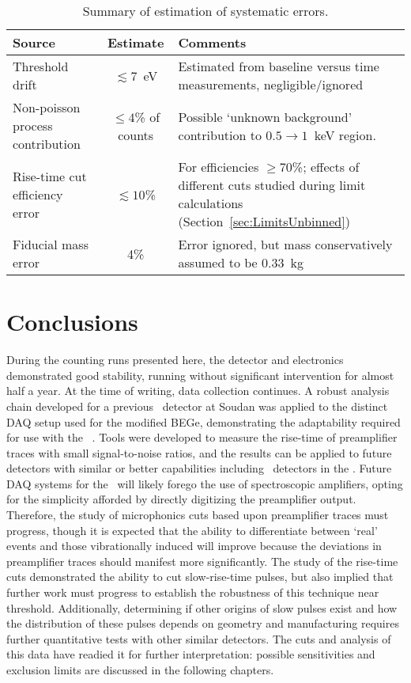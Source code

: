 			\begin{table} 
				\centering
				\begin{tabular}{p{}  c  p{}  } 
				\toprule
					Source & Estimate & Comments \\
				\midrule	
					Threshold drift & $\lesssim7$~eV & Estimated from baseline versus time measurements, negligible/ignored \\
					Non-poisson process contribution & $\leq4$\% of counts & Possible `unknown background' contribution to $0.5\to1$~keV region.  \\			
					Rise-time cut efficiency error & $\lesssim10$\% & For efficiencies $\geq$70\%; effects of different cuts studied during limit calculations (Section~\ref{sec:LimitsUnbinned}) \\
					Fiducial mass error & 4\% & Error ignored, but mass conservatively assumed to be 0.33~kg\\

				\bottomrule
				\end{tabular}	
				\caption{Summary of estimation of systematic errors.}
				\label{tab:BeGeSysErrors}
			\end{table}
	\section{Conclusions}
     	\label{sec:BeGeConclusions}		
	
	During the counting runs presented here, the detector and electronics demonstrated good stability, running without significant intervention for almost half a year.  At the time of writing, data collection continues.  A robust analysis chain developed for a previous \ppc~detector at Soudan was applied to the distinct DAQ setup used for the modified BEGe, demonstrating the adaptability required for use with the \MJ~\minmod.  Tools were developed to measure the rise-time of preamplifier traces with small signal-to-noise ratios, and the results can be applied to future detectors with similar or better capabilities including \ppc~detectors in the \minmod.  Future DAQ systems for the \minmod~will likely forego the use of spectroscopic amplifiers, opting for the simplicity afforded by directly digitizing the preamplifier output.  Therefore, the study of microphonics cuts based upon preamplifier traces must progress, though it is expected that the ability to differentiate between `real' events and those vibrationally induced will improve because the deviations in preamplifier traces should manifest more significantly.  The study of the rise-time cuts demonstrated the ability to cut slow-rise-time pulses, but also implied that further work must progress to establish the robustness of this technique near threshold.  Additionally, determining if other origins of slow pulses exist and how the distribution of these pulses depends on geometry and manufacturing requires further quantitative tests with other similar detectors.  The cuts and analysis of this data have readied it for further interpretation: possible sensitivities and exclusion limits are discussed in the following chapters.
